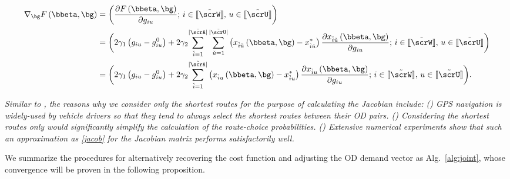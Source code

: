 \documentclass[3p]{elsarticle}
\newcommand{\rmnum}[1]{\romannumeral #1}
\begin{document}
\begin{align}
	\nabla_{\bg} F\left(\bbeta, \bg  \right) &= \left( {\frac{{\partial F\left(\bbeta, \bg  \right)}}{{\partial {g _{iu}}}}};\, i \in [\kern-0.15em[ \tilde \scrW 
	]\kern-0.15em], \, u \in [\kern-0.15em[ \tilde \scrU 
	]\kern-0.15em] \right) \notag \\
	&= \bigg( 2 \gamma_1 \left( {{g_{iu}} - g^0_{iu}} \right) + 2 \gamma_2 {\sum\limits^{|\tilde \scrA|}_{\check{i} = 1} {\sum\limits^{|\tilde \scrU|}_{\check u = 1} {\left( {{x_{\check{i}\check{u}}}\left(\bbeta, \bg  \right) - {{ x}^*_{\check{i}\check{u}}}} \right)\frac{{\partial {x_{\check{i}\check{u}}}\left(\bbeta, \bg  \right)}}{{\partial {g_{iu}}}}} ;\,i \in [\kern-0.15em[ \tilde \scrW 
			]\kern-0.15em], \, u \in [\kern-0.15em[ \tilde \scrU 
			]\kern-0.15em]}} \bigg) \notag \\
	&= \bigg(2 \gamma_1 \left( {{g_{iu}} - g^0_{iu}} \right) + 2 \gamma_2 {\sum\limits^{|\tilde \scrA|}_{\check{i} = 1} {{\left( {{x_{\check{i}u}}\left(\bbeta, \bg  \right) - {{x}^*_{\check{i}u}}} \right)\frac{{\partial {x_{\check{i}u}}\left(\bbeta, \bg  \right)}}{{\partial {g_{iu}}}}} ;\,i \in [\kern-0.15em[ \tilde \scrW 
			]\kern-0.15em], \, u \in [\kern-0.15em[ \tilde \scrU 
			]\kern-0.15em]}} \bigg). \label{gradient}
\end{align}

	
\begin{rmk} \label{rem:shortest} \em{Similar to \cite{IFAC17,ieee18},
    the reasons why we consider only the shortest routes for the purpose
    of calculating the Jacobian include: (\rmnum{1}) GPS navigation is
    widely-used by vehicle drivers so that they tend to always select
    the shortest routes between their OD pairs. (\rmnum{2}) Considering
    the shortest routes only would significantly simplify the
    calculation of the route-choice probabilities. (\rmnum{3}) Extensive
    numerical experiments show that such an approximation as
    \eqref{jacob} for the Jacobian matrix performs satisfactorily well.}
\end{rmk}

We summarize the procedures for alternatively recovering the cost
function and adjusting the OD demand vector as Alg.~\ref{alg:joint},
whose convergence will be proven in the following proposition.
	
\end{document}
